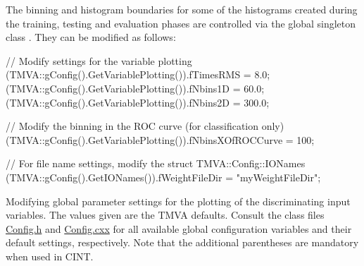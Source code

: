 The binning and histogram boundaries for some of the histograms
created during the training, testing and evaluation phases are
controlled via the global singleton class . They
can be modified as follows:
\begin{codeexample}
\begin{tmvacode}
// Modify settings for the variable plotting
(TMVA::gConfig().GetVariablePlotting()).fTimesRMS = 8.0;
(TMVA::gConfig().GetVariablePlotting()).fNbins1D  = 60.0;
(TMVA::gConfig().GetVariablePlotting()).fNbins2D  = 300.0;

// Modify the binning in the ROC curve (for classification only)
(TMVA::gConfig().GetVariablePlotting()).fNbinsXOfROCCurve = 100;

// For file name settings, modify the struct TMVA::Config::IONames
(TMVA::gConfig().GetIONames()).fWeightFileDir = "myWeightFileDir";
\end{tmvacode}
\caption[.]{\codeexampleCaptionSize Modifying global parameter
  settings for the plotting of the discriminating input variables. The
  values given are the TMVA defaults. Consult the class files
  \href{http://tmva.svn.sourceforge.net/viewvc/tmva/trunk/TMVA/src/Config.h?view=markup}{Config.h}
  and
  \href{http://tmva.svn.sourceforge.net/viewvc/tmva/trunk/TMVA/src/Config.cxx?view=markup}{Config.cxx}
  for all available global configuration variables and their default
  settings, respectively.  Note that the additional parentheses are
  mandatory when used in CINT.}
\label{ce:gconfig}
\end{codeexample}
